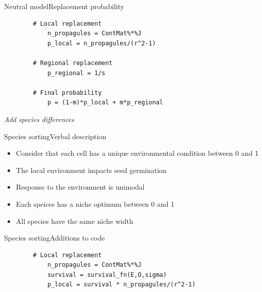 \documentclass[10pt,aspectratio=149]{beamer}
\begin{document}

\begin{frame}[fragile]{Neutral model}{Replacement probability}

    \begin{verbatim}
        # Local replacement 
            n_propagules = ContMat%*%J
            p_local = n_propagules/(r^2-1)

        # Regional replacement 
            p_regional = 1/s

        # Final probability
            p = (1-m)*p_local + m*p_regional
    \end{verbatim}

\end{frame}


{
\usebackgroundtemplate{}
\begin{frame}

	\pagecolor{BDQC1st}
	\color{white}

	\LARGE{\textit{Add species differences}}

\end{frame}
}


\begin{frame}{Species sorting}{Verbal description}

    \begin{itemize}
        \item Consider that each cell has a unique environmental condition between 0 and 1
        \item The local environment impacts seed germination 
        \item Response to the environment is unimodal
        \item Each speices has a niche optimum between 0 and 1
        \item All species have the same niche width
    \end{itemize}

\end{frame}


\begin{frame}[fragile]{Species sorting}{Additions to code}

    \begin{verbatim}
        # Local replacement 
            n_propagules = ContMat%*%J
            survival = survival_fn(E,O,sigma)
            p_local = survival * n_propagules/(r^2-1)
    \end{verbatim}

\end{frame}
\end{document}
